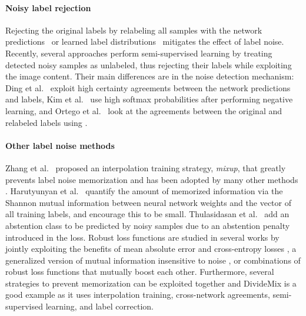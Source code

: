 \documentclass[final]{cvpr}
\begin{document}
\paragraph{Noisy label rejection}

Rejecting the original labels by relabeling all samples with the network predictions~\cite{2018_CVPR_JointOpt} or learned label distributions~\cite{2019_CVPR_JointOptimizImproved} mitigates the effect of label noise. Recently, several approaches perform semi-supervised learning \cite{2018_WACV_SemiSupNoise,2019_ICCV_NegativeLearning,2020_ICPR_SSLnoise} by treating detected noisy samples as unlabeled, thus rejecting their labels while exploiting the image content. Their main differences are in the noise detection mechanism: Ding et al.~\cite{2018_WACV_SemiSupNoise} exploit high certainty agreements between the network predictions and labels, Kim et al.~\cite{2019_ICCV_NegativeLearning} use high softmax probabilities after performing negative learning, and Ortego et al.~\cite{2020_ICPR_SSLnoise} look at the agreements between the original and relabeled labels using \cite{2018_CVPR_JointOpt}.

\paragraph*{Other label noise methods}

Zhang et al.~\cite{2018_ICLR_mixup} proposed an interpolation training strategy, \emph{mixup}, that greatly prevents label noise memorization and has been adopted by many other methods \cite{2019_ICML_DynamicBootstrapping,2020_ICLR_DivideMix,2020_ICML_DatasetOOD,2020_ICPR_SSLnoise,2020_NeurIPS_EarlyReg}.
Harutyunyan et al.~\cite{2020_ICML_NNweightsNoise} quantify the amount of memorized information via the Shannon mutual information between neural network weights and the vector of all training labels, and encourage this to be small. Thulasidasan
et al.~\cite{2019_ICML_AbstentionLabelNoise} add an abstention class to be predicted by noisy samples due to an abstention penalty introduced in the loss. Robust loss functions are studied in several works by jointly exploiting the benefits of mean absolute error and cross-entropy losses \cite{2018_NeurIPS_GCE}, a generalized version of mutual information insensitive to noise \cite{2019_NeurIPS_LDMI}, or \cite{2020_ICML_NormalizedLossFunc} combinations of robust loss functions that mutually boost each other. Furthermore, several strategies to prevent memorization can be exploited together and DivideMix \cite{2020_ICLR_DivideMix} is a good example as it uses interpolation training, cross-network agreements, semi-supervised learning, and label correction. 
\end{document}
